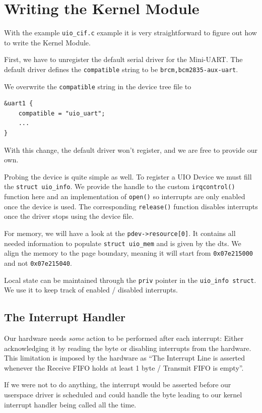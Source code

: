 \documentclass[../main.tex]{subfiles}
\begin{document}
    \section{Writing the Kernel Module}
    With the example \texttt{uio\_cif.c} example it is very straightforward to figure out how to write the Kernel Module.

    First, we have to unregister the default serial driver for the Mini-UART. The default driver defines the \texttt{compatible} string to be \texttt{brcm,bcm2835-aux-uart}.

    We overwrite the \texttt{compatible} string in the device tree file to
    \begin{verbatim}
&uart1 {
    compatible = "uio_uart";
    ...
}
    \end{verbatim}

    With this change, the default driver won't register, and we are free to provide our own.

    Probing the device is quite simple as well. To register a UIO Device we must fill the \texttt{struct uio\_info}. We provide the handle to the custom \texttt{irqcontrol()} function here and an implementation of \texttt{open()} so interrupts are only enabled once the device is used. The corresponding \texttt{release()} function disables interrupts once the driver stops using the device file.

    For memory, we will have a look at the \texttt{pdev->resource[0]}. It contains all needed information to populate \texttt{struct uio\_mem} and is given by the dts. We align the memory to the page boundary, meaning it will start from \texttt{0x07e215000} and not \texttt{0x07e215040}. \todo[why?]

    Local state can be maintained through the \texttt{priv} pointer in the \texttt{uio\_info struct}. We use it to keep track of enabled / disabled interrupts.

    \subsection{The Interrupt Handler}
    Our hardware needs \textit{some} action to be performed after each interrupt: Either acknowledging it by reading the byte or disabling interrupts from the hardware. This limitation is imposed by the hardware as \enquote{The Interrupt Line is asserted whenever the
    Receive FIFO holds at least 1 byte / Transmit FIFO is empty}.

    If we were not to do anything, the interrupt would be asserted before our userspace driver is scheduled and could handle the byte leading to our kernel interrupt handler being called all the time.
\end{document}
